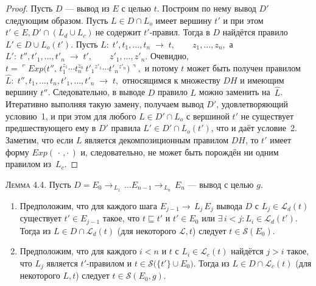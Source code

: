 \begin{proof}
Пусть $D$ — вывод из $E$ с целью $t$.  
Построим по нему вывод $D'$ следующим образом.  
Пусть $L\in D\cap L_{o}$ имеет вершину $t'$ и при этом
\(
  t'\in E,
  D'\cap (L_{d}\cup L_{c})\ \text{не содержит $t'$-правил.}
\)
Тогда в $D$ найдётся правило $L'\in D\cup L_{o}(t')$.
Пусть
\(
  L:\;
  t',t_{1},\dots,t_{n}\;\longrightarrow\;t,
  \qquad
  z_{1},\dots,z_{n},
\)
а
\(
  L':\;
  t'',t'_{1},\dots,t'_{n}\;\longrightarrow\;t',
  \qquad
  z'_{1},\dots,z'_{n}.
\)
Очевидно,
\(
  t
  =\ulcorner Exp\!\bigl(
       t'',\,
       t_{1}^{z_{1}}\!\cdots t_{n}^{z_{n}}
       \,t'_{1}{}^{z'_{1}}\!\cdots t'_{n}{}^{z'_{n}}
     \bigr)\urcorner,
\)
и потому $t$ может быть получен правилом
\(
  \widehat{L}:\;
  t'',t_{1},\dots,t_{n},t'_{1},\dots,t'_{n}\;\longrightarrow\;t,
\)
относящимся к множеству $DH$ и имеющим вершину $t''$.
Следовательно, в выводе $D$ правило $L$ можно заменить
на~$\widehat{L}$.  Итеративно выполняя такую замену,
получаем вывод $D'$, удовлетворяющий условию~1,
и при этом для любого $L\in D'\cap L_{o}$ с вершиной $t'$
не существует предшествующего ему в $D'$ правила
$L'\in D'\cap L_{o}(t')$,
что и даёт условие~2.
Заметим, что если $L$ является декомпозиционным
правилом $DH$, то $t'$ имеет форму $Exp(\,\cdot\,,\cdot\,)$
и, следовательно, не может быть порождён ни одним правилом из~$L_{c}$.
\end{proof}

\textsc{Лемма 4.4.}
Пусть
\(D = E_0 \rightarrow_{\,L_1\,} \dots
      E_{n-1} \rightarrow_{\,L_n\,} E_n\)
— вывод с целью \(g\).

\begin{enumerate}
\item
  Предположим, что для каждого шага
  \(E_{j-1} \rightarrow{\,L_j\,} E_j\) вывода \(D\)
  с \(L_j \in \mathcal L_{d}(t)\)
  существует \(t'\in E_{j-1}\) такое, что
  \(t \sqsubseteq t'\) и
  \(t'\in E_0\) \;или\;
  \(\exists\,i<j: L_i\in \mathcal L_{d}(t')\).
  Тогда из \(L\in D\cap \mathcal L_{d}(t)\)
  (для некоторого \(\mathcal L,t\)) следует
  \(t\in \mathcal S(E_0)\).

\item
  Предположим, что для каждого \(i<n\) и \(t\) с
  \(L_i\in \mathcal L_{c}(t)\)
  найдётся \(j>i\) такое, что
  \(L_j\) является \(t'\)-правилом
  и \(t\in \mathcal S\bigl(\{t'\}\cup E_0\bigr)\).
  Тогда из \(L\in D\cap \mathcal L_{c}(t)\)
  (для некоторого \(L,t\)) следует
  \(t\in \mathcal S(E_0,g)\).
\end{enumerate}

